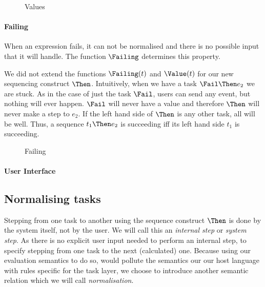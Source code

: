 \begin{figure}[h]
  \small
  \caption{Values} \label{fig:observation-value}
\end{figure}



\paragraph{Failing}

When an expression fails, it can not be normalised and there is no possible
input that it will handle. The function $\Failing$ determines this property.

We did not extend the functions $\Failing(t)$ and $\Value(t)$ for our new sequencing construct $\Then$.
Intuitively,
when we have a task $\Fail \Then e_2$ we are stuck.
As in the case of just the task $\Fail$,
users can send any event,
but nothing will ever happen.
$\Fail$ will never have a value
and therefore $\Then$ will never make a step to $e_2$.
If the left hand side of $\Then$ is any other task,
all will be well.
Thus,
a sequence $t_1 \Then e_2$ is succeeding iff its left hand side $t_1$ is succeeding.

\begin{figure}[h]
  \small
  \caption{Failing} \label{fig:observation-failing}
\end{figure}



\paragraph{User Interface}




\subsection{Normalising tasks}
\label{sec:normalise}

Stepping from one task to another using the sequence construct $\Then$ is done by the system itself,
not by the user.
We will call this an \emph{internal step} or \emph{system step}.
As there is no explicit user input needed to perform an internal step,
to specify stepping from one task to the next (calculated) one.
Because using our evaluation semantics to do so,
would pollute the semantics our our host language with rules specific for the task layer,
we choose to introduce another semantic relation which we will call \emph{normalisation}.

